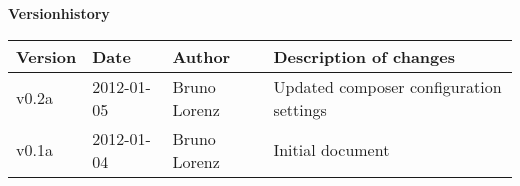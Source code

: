 \noindent \textbf{\Large Versionhistory}\\

\newcommand{\versionrow}[4]{
    \small #1 &
    \small #2 &
    \small #3 &
    \small #4 \\
    \hline
}


\begin{table}[h]
    \begin{tabular*}{\textwidth}{l:l:l:l}
        \hline
        \versionrow{\textbf{Version}}{\textbf{Date}}{\textbf{Author}}{\textbf{Description of changes}}
        \versionrow{v0.2a}{2012-01-05}{Bruno Lorenz}{Updated composer configuration settings}
        \versionrow{v0.1a}{2012-01-04}{Bruno Lorenz}{Initial document}
    \end{tabular*}
\end{table}

